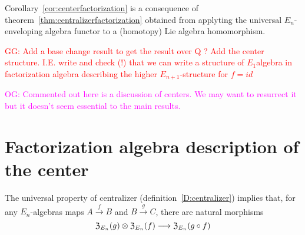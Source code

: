 \documentclass[11pt]{amsart}
\numberwithin{equation}{section}
\def\owen{\textcolor{magenta}{OG: }\textcolor{magenta}}
\def\greg{\textcolor{red}{GG: }\textcolor{red}}
\begin{document}
\smallskip 

Corollary~\ref{cor:centerfactorization}  is a consequence of theorem~\ref{thm:centralizerfactorization} obtained from applyting the universal 
$E_n$-enveloping algebra functor to a (homotopy) Lie algebra homomorphism.

\greg{Add a base change result to get the result over Q ? Add the center structure. I.E. write and check (!) that we can write a structure of $E_1$algebra in factorization algebra describing the higher $E_{n+1}$-structure for $f=id$} 

\owen{Commented out here is a discussion of centers. We may want to resurrect it but it doesn't seem essential to the main results.}

\section{Factorization algebra description of the center}
\label{S:centerinFacAlg}

The universal property of centralizer (definition~\ref{D:centralizer}) implies that, for any $E_n$-algebras maps $A\stackrel{f}\to B$ and
$B\stackrel{g}\to C$, there are natural morphisms
\begin{equation}\label{eqdef:canonicaltocentralizers} {\frak Z}_{E_n}(g) \otimes {\frak Z}_{E_n}(f) \longrightarrow {\frak Z}_{E_n}(g\circ f)
\end{equation}
 
\end{document}
